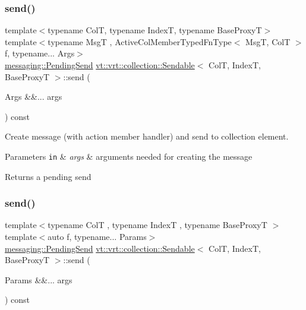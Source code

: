 \mbox{\label{structvt_1_1vrt_1_1collection_1_1_sendable_a65e5494a18b398b52f12c056cff1dc16}} 
\subsubsection{\texorpdfstring{send()}{send()}\hspace{0.1cm}{\footnotesize\ttfamily [6/7]}}
{\footnotesize\ttfamily template$<$typename ColT, typename IndexT, typename Base\+ProxyT$>$ \\
template$<$typename MsgT , Active\+Col\+Member\+Typed\+Fn\+Type$<$ Msg\+T, Col\+T $>$ f, typename... Args$>$ \\
\hyperlink{structvt_1_1messaging_1_1_pending_send}{messaging\+::\+Pending\+Send} \hyperlink{structvt_1_1vrt_1_1collection_1_1_sendable}{vt\+::vrt\+::collection\+::\+Sendable}$<$ ColT, IndexT, Base\+ProxyT $>$\+::send (\begin{DoxyParamCaption}\item[{Args \&\&...}]{args }\end{DoxyParamCaption}) const}



Create message (with action member handler) and send to collection element. 


\begin{DoxyParams}[1]{Parameters}
\mbox{\tt in}  & {\em args} & arguments needed for creating the message\\
\hline
\end{DoxyParams}
\begin{DoxyReturn}{Returns}
a pending send 
\end{DoxyReturn}
\mbox{\label{structvt_1_1vrt_1_1collection_1_1_sendable_a2de5ccb7685ed0d975315944da492491}} 
\subsubsection{\texorpdfstring{send()}{send()}\hspace{0.1cm}{\footnotesize\ttfamily [7/7]}}
{\footnotesize\ttfamily template$<$typename ColT , typename IndexT , typename Base\+ProxyT $>$ \\
template$<$auto f, typename... Params$>$ \\
\hyperlink{structvt_1_1messaging_1_1_pending_send}{messaging\+::\+Pending\+Send} \hyperlink{structvt_1_1vrt_1_1collection_1_1_sendable}{vt\+::vrt\+::collection\+::\+Sendable}$<$ ColT, IndexT, Base\+ProxyT $>$\+::send (\begin{DoxyParamCaption}\item[{Params \&\&...}]{args }\end{DoxyParamCaption}) const}




